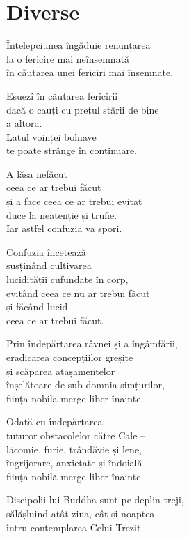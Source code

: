 
\chapter{Diverse}


Înțelepciunea îngăduie renunțarea\\
la o fericire mai neînsemnată\\
în căutarea unei fericiri mai însemnate.


Eșuezi în căutarea fericirii\\
dacă o cauți cu prețul stării de bine\\
a altora.\\
Lațul voinței bolnave\\
te poate strânge în continuare.


A lăsa nefăcut\\
ceea ce ar trebui făcut\\
și a face ceea ce ar trebui evitat\\
duce la neatenție și trufie.\\
Iar astfel confuzia va spori.


Confuzia încetează\\
susținând cultivarea\\
lucidității cufundate în corp,\\
evitând ceea ce nu ar trebui făcut\\
și făcând lucid\\
ceea ce ar trebui făcut.


Prin îndepărtarea râvnei și a îngâmfării,\\
eradicarea concepțiilor greșite\\
și scăparea atașamentelor\\
înșelătoare de sub domnia simțurilor,\\
ființa nobilă merge liber înainte.


Odată cu îndepărtarea\\
tuturor obstacolelor către Cale –\\
lăcomie, furie, trândăvie și lene,\\
îngrijorare, anxietate și îndoială –\\
ființa nobilă merge liber înainte.


Discipolii lui Buddha sunt pe deplin treji,\\
sălășluind atât ziua, cât și noaptea\\
întru contemplarea Celui Trezit.



